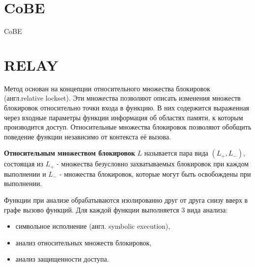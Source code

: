 \section{CoBE}
CoBE

\section{RELAY}

Метод основан на концепции относительного множества блокировок (англ.relative lockset). Эти множества позволяют описать изменения множеств блокировок относительно точки входа в функцию. В них содержится выраженная через входные параметры функции информация об областях памяти, к которым производится доступ. Относительные множества блокировок позволяют обобщить поведение функции независимо от контекста её вызова.

\textbf{Относительным множеством блокировок} $L$ называется пара вида $(L_{+}, L_{-})$, состоящая из $L_{+}$ - множества безусловно захватываемых блокировок при каждом выполнении и $L_{-}$ - множества блокировок, которые могут быть освобождены при выполнении.

Функции при анализе обрабатываются изолированно друг от друга снизу вверх в графе вызово функций. Для каждой функции выполняется 3 вида анализа:
\begin{itemize}
\item символьное исполнение (англ. symbolic execution),
\item анализ относительных множеств блокировок,
\item анализ защищенности доступа.
\end{itemize}
